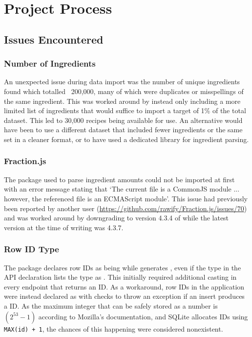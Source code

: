 \section{Project Process}

\subsection{Issues Encountered}

\subsubsection{Number of Ingredients}
An unexpected issue during data import was the number of unique ingredients found which totalled ~200,000, many
of which were duplicates or misspellings of the same ingredient. This was worked around by instead only including a
more limited list of ingredients that would suffice to import a target of 1\% of the total dataset. This led to 30,000 recipes
being available for use. An alternative would have been to use a different dataset that included fewer ingredients or the same
set in a cleaner format, or to have used a dedicated library for ingredient parsing.

\subsubsection{Fraction.js}
The  package used to parse ingredient amounts could not be imported at first with an error message
stating that \enquote*{The current file is a CommonJS module ... however, the referenced file is an ECMAScript module}.
This issue had previously been reported by another user (\href{https://github.com/rawify/Fraction.js/issues/70}{https://github.com/rawify/Fraction.js/issues/70})
and was worked around by downgrading to version 4.3.4 of  while the latest version at the time
of writing was 4.3.7.

\subsubsection{Row ID Type}
The  package declares row IDs as being 
while  generates , even if the type in the API
declaration lists the type as . This initially required additional casting in every endpoint
that returns an ID. As a workaround, row IDs in the application were instead declared as 
with checks to throw an exception if an insert produces a  ID. As the maximum integer that can be safely stored as a number is
$(2^{53} - 1)$ according to Mozilla's documentation, and SQLite allocates IDs using \texttt{MAX(id) + 1},
the chances of this happening were considered nonexistent.


